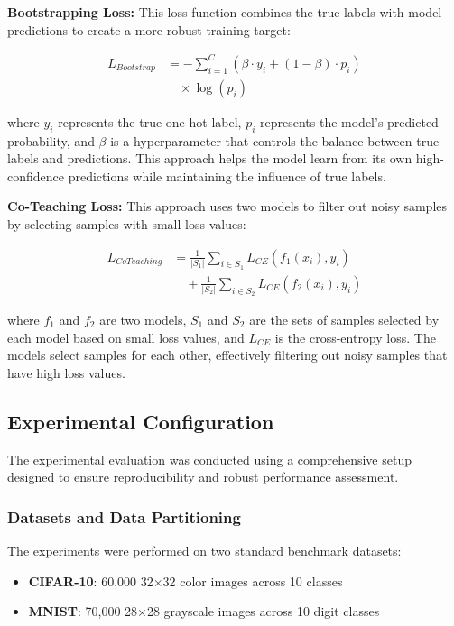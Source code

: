 \documentclass{ieeeaccess}
\begin{document}
\textbf{Bootstrapping Loss:} This loss function combines the true labels with model predictions to create a more robust training target:

\begin{align}
L_{Bootstrap} &= -\sum_{i=1}^{C} \left(\beta \cdot y_i + (1-\beta) \cdot p_i\right) \nonumber \\
&\quad \times \log(p_i)
\label{eq:bootstrap}
\end{align}

where $y_i$ represents the true one-hot label, $p_i$ represents the model's predicted probability, and $\beta$ is a hyperparameter that controls the balance between true labels and predictions. This approach helps the model learn from its own high-confidence predictions while maintaining the influence of true labels.

\textbf{Co-Teaching Loss:} This approach uses two models to filter out noisy samples by selecting samples with small loss values:

\begin{align}
L_{CoTeaching} &= \frac{1}{|S_1|} \sum_{i \in S_1} L_{CE}(f_1(x_i), y_i) \nonumber \\
&\quad + \frac{1}{|S_2|} \sum_{i \in S_2} L_{CE}(f_2(x_i), y_i)
\label{eq:co_teaching}
\end{align}

where $f_1$ and $f_2$ are two models, $S_1$ and $S_2$ are the sets of samples selected by each model based on small loss values, and $L_{CE}$ is the cross-entropy loss. The models select samples for each other, effectively filtering out noisy samples that have high loss values.

\subsection{Experimental Configuration}
The experimental evaluation was conducted using a comprehensive setup designed to ensure reproducibility and robust performance assessment.

\subsubsection{Datasets and Data Partitioning}
The experiments were performed on two standard benchmark datasets:
\begin{itemize}
\item \textbf{CIFAR-10}: 60,000 32×32 color images across 10 classes
\item \textbf{MNIST}: 70,000 28×28 grayscale images across 10 digit classes
\end{itemize}
\end{document}
